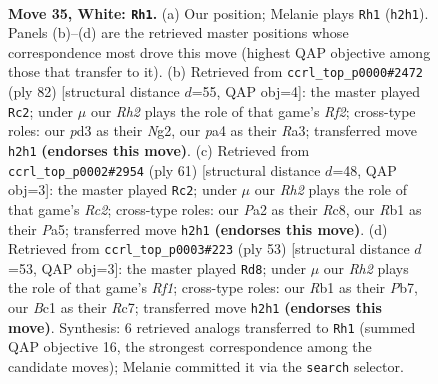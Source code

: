\documentclass[11pt]{article}
\begin{document}
\clearpage

\begin{figure}[p]\centering
\begin{subfigure}{0.46\textwidth}\centering
\resizebox{\linewidth}{!}{%
\newchessgame
\chessboard[
  setfen={r6k/5p1r/5n2/8/p3p2p/3p3P/PP3P1R/1RB1K3 w - - 10 35},
  showmover=false,
  pgfstyle=straightmove, color=movearrow, markmove={h2-h1}
]}
\caption{}
\end{subfigure}\hfill
\begin{subfigure}{0.46\textwidth}\centering
\resizebox{\linewidth}{!}{%
\newchessgame
\chessboard[
  setfen={8/p2r2k1/2nr2p1/7p/7P/R4PP1/5RNK/8 w - - 14 42},
  showmover=false,
  pgfstyle=straightmove, color=movearrow, markmove={f2-c2}
]}
\caption{}
\end{subfigure}
\\[4pt]
\begin{subfigure}{0.46\textwidth}\centering
\resizebox{\linewidth}{!}{%
\newchessgame
\chessboard[
  setfen={2r3k1/2r2pp1/7p/p3P3/1b2R3/5N1P/P3RPP1/6K1 b - - 1 31},
  showmover=false,
  pgfstyle=straightmove, color=movearrow, markmove={c7-c2}
]}
\caption{}
\end{subfigure}\hfill
\begin{subfigure}{0.46\textwidth}\centering
\resizebox{\linewidth}{!}{%
\newchessgame
\chessboard[
  setfen={5rk1/1pr3pp/8/2p2pP1/5P2/1P1P4/P4PK1/R4R2 b - - 0 27},
  showmover=false,
  pgfstyle=straightmove, color=movearrow, markmove={f8-d8}
]}
\caption{}
\end{subfigure}
\caption{\textbf{Move 35, White: \texttt{Rh1}.} (a) Our position; Melanie plays \texttt{Rh1} (\texttt{h2h1}). Panels (b)--(d) are the retrieved master positions whose correspondence most drove this move (highest QAP objective among those that transfer to it). (b) Retrieved from \texttt{ccrl\_top\_p0000\#2472} (ply 82) [structural distance $d$=55, QAP obj=4]: the master played \texttt{Rc2}; under $\mu$ our \emph{Rh2} plays the role of that game's \emph{Rf2}; cross-type roles: our \emph{p}d3 as their \emph{N}g2, our \emph{p}a4 as their \emph{R}a3; transferred move \texttt{h2h1} \textbf{(endorses this move)}. (c) Retrieved from \texttt{ccrl\_top\_p0002\#2954} (ply 61) [structural distance $d$=48, QAP obj=3]: the master played \texttt{Rc2}; under $\mu$ our \emph{Rh2} plays the role of that game's \emph{Rc2}; cross-type roles: our \emph{P}a2 as their \emph{R}c8, our \emph{R}b1 as their \emph{P}a5; transferred move \texttt{h2h1} \textbf{(endorses this move)}. (d) Retrieved from \texttt{ccrl\_top\_p0003\#223} (ply 53) [structural distance $d$=53, QAP obj=3]: the master played \texttt{Rd8}; under $\mu$ our \emph{Rh2} plays the role of that game's \emph{Rf1}; cross-type roles: our \emph{R}b1 as their \emph{P}b7, our \emph{B}c1 as their \emph{R}c7; transferred move \texttt{h2h1} \textbf{(endorses this move)}. Synthesis: 6 retrieved analogs transferred to \texttt{Rh1} (summed QAP objective 16, the strongest correspondence among the candidate moves); Melanie committed it via the \texttt{search} selector.}
\label{fig:thought-m68}
\end{figure}
\end{document}
